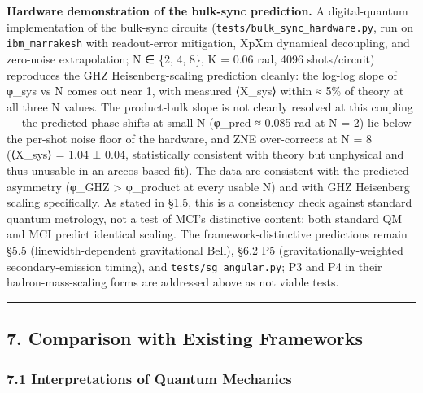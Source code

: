 \documentclass[
]{article}
\begin{document}
\textbf{Hardware demonstration of the bulk-sync prediction.} A
digital-quantum implementation of the bulk-sync circuits
(\texttt{tests/bulk\_sync\_hardware.py}, run on \texttt{ibm\_marrakesh}
with readout-error mitigation, XpXm dynamical decoupling, and zero-noise
extrapolation; N ∈ \{2, 4, 8\}, K = 0.06 rad, 4096 shots/circuit)
reproduces the GHZ Heisenberg-scaling prediction cleanly: the log-log
slope of φ\_sys vs N comes out near 1, with measured ⟨X\_sys⟩ within ≈
5\% of theory at all three N values. The product-bulk slope is not
cleanly resolved at this coupling --- the predicted phase shifts at
small N (φ\_pred ≈ 0.085 rad at N = 2) lie below the per-shot noise
floor of the hardware, and ZNE over-corrects at N = 8 (⟨X\_sys⟩ = 1.04 ±
0.04, statistically consistent with theory but unphysical and thus
unusable in an arccos-based fit). The data are consistent with the
predicted asymmetry (φ\_GHZ \textgreater{} φ\_product at every usable N)
and with GHZ Heisenberg scaling specifically. As stated in §1.5, this is
a consistency check against standard quantum metrology, not a test of
MCI's distinctive content; both standard QM and MCI predict identical
scaling. The framework-distinctive predictions remain §5.5
(linewidth-dependent gravitational Bell), §6.2 P5
(gravitationally-weighted secondary-emission timing), and
\texttt{tests/sg\_angular.py}; P3 and P4 in their hadron-mass-scaling
forms are addressed above as not viable tests.

\begin{center}\rule{0.5\linewidth}{0.5pt}\end{center}

\subsection{7. Comparison with Existing
Frameworks}\label{comparison-with-existing-frameworks}

\subsubsection{7.1 Interpretations of Quantum
Mechanics}\label{interpretations-of-quantum-mechanics}
\end{document}
